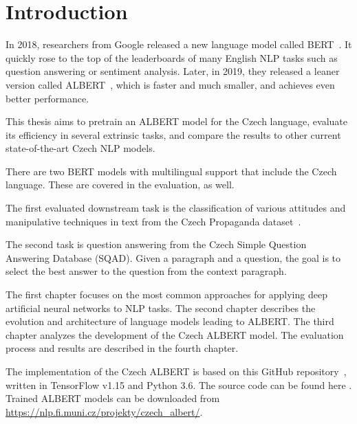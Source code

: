 \documentclass[
  printed, %
  color,   %
  table,   %
  oneside, %
  lof,     %
  lot,     %
]{fithesis3}
\begin{document}
\chapter*{Introduction}


In 2018, researchers from Google released a new language model called BERT~\parencite{bert}. It quickly rose to the top of the leaderboards of many English NLP tasks such as question answering or sentiment analysis. Later, in 2019, they released a leaner version called ALBERT~\parencite{albert}, which is faster and much smaller, and achieves even better performance.

This thesis aims to pretrain an ALBERT model for the Czech language, evaluate its efficiency in several extrinsic tasks, and compare the results to other current state-of-the-art Czech NLP models. 

There are two BERT models with multilingual support that include the Czech language. These are covered in the evaluation, as well.

The first evaluated downstream task is the classification of various attitudes and manipulative techniques in text from the Czech Propaganda dataset~\parencite{propaganda}. 

The second task is question answering from the Czech Simple Question Answering Database (SQAD)\parencite{sqad}. Given a paragraph and a question, the goal is to select the best answer to the question from the context paragraph.

The first chapter focuses on the most common approaches for applying deep artificial neural networks to NLP tasks. The second chapter describes the evolution and architecture of language models leading to ALBERT. The third chapter analyzes the development of the Czech ALBERT model. The evaluation process and results are described in the fourth chapter.

The implementation of the Czech ALBERT is based on this GitHub repository~\parencite{albert_repo}, written in TensorFlow v1.15 and Python 3.6. The source code can be found here \parencite{thesis_repo}. Trained ALBERT models can be downloaded from \url{https://nlp.fi.muni.cz/projekty/czech_albert/}.

\end{document}
